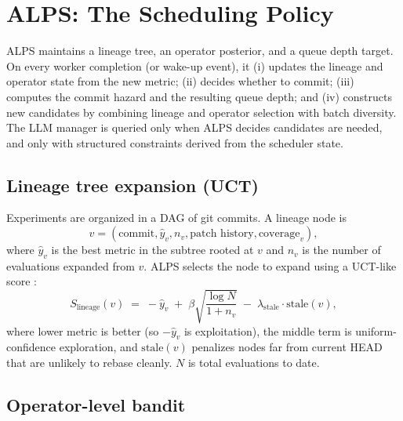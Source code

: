 \documentclass{article}
\newcommand{\alps}{ALPS\xspace}
\begin{document}
\section{ALPS: The Scheduling Policy}
\label{sec:alps}

\alps maintains a lineage tree, an operator posterior, and a queue depth target. On every worker completion (or wake-up event), it (i) updates the lineage and operator state from the new metric; (ii) decides whether to commit; (iii) computes the commit hazard and the resulting queue depth; and (iv) constructs new candidates by combining lineage and operator selection with batch diversity. The LLM manager is queried only when \alps decides candidates are needed, and only with structured constraints derived from the scheduler state.

\subsection{Lineage tree expansion (UCT)}
\label{sec:alps:tree}

Experiments are organized in a DAG of git commits. A lineage node is
\[
v = (\text{commit}, \hat y_v, n_v, \text{patch history}, \text{coverage}_v),
\]
where $\hat y_v$ is the best metric in the subtree rooted at $v$ and $n_v$ is the number of evaluations expanded from $v$. \alps selects the node to expand using a UCT-like score \citep{uct}:
\begin{equation}
  S_{\mathrm{lineage}}(v) \;=\; -\hat y_v \;+\; \beta \sqrt{\frac{\log N}{1 + n_v}} \;-\; \lambda_{\mathrm{stale}} \cdot \mathrm{stale}(v),
  \label{eq:uct}
\end{equation}
where lower metric is better (so $-\hat y_v$ is exploitation), the middle term is uniform-confidence exploration, and $\mathrm{stale}(v)$ penalizes nodes far from current HEAD that are unlikely to rebase cleanly. $N$ is total evaluations to date.

\subsection{Operator-level bandit}
\label{sec:alps:operators}
\end{document}
